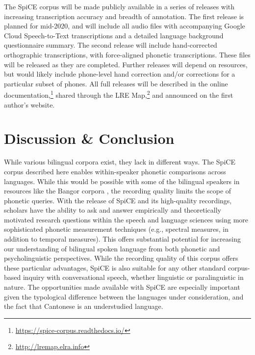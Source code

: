 The SpiCE corpus will be made publicly available in a series of releases with increasing transcription accuracy and breadth of annotation. The first release is planned for mid-2020, and will include all audio files with accompanying Google Cloud Speech-to-Text transcriptions and a detailed language background questionnaire summary. The second release will include hand-corrected orthographic transcriptions, with force-aligned phonetic transcriptions. These files will be released as they are completed. Further releases will depend on resources, but would likely include phone-level hand correction and/or corrections for a particular subset of phones. All full releases will be described in the online documentation,\footnote{\url{https://spice-corpus.readthedocs.io/}} shared through the LRE Map,\footnote{\url{http://lremap.elra.info}} and announced on the first author's website.

\section{Discussion \& Conclusion}\label{ch2:subsec:discussion}

While various bilingual corpora exist, they lack in different ways. The SpiCE corpus described here enables within-speaker phonetic comparisons across languages. While this would be possible with some of the bilingual speakers in resources like the Bangor corpora \citep{deuchar_2014_corpora}, the recording quality limits the scope of phonetic queries. With the release of SpiCE and its high-quality recordings, scholars have the ability to ask and answer empirically and theoretically motivated research questions within the speech and language sciences using more sophisticated phonetic measurement techniques (e.g., spectral measures, in addition to temporal measures). This offers substantial potential for increasing our understanding of bilingual spoken language from both phonetic and psycholinguistic perspectives. While the recording quality of this corpus offers these particular advantages, SpiCE is also suitable for any other standard corpus-based inquiry with conversational speech, whether linguistic or paralinguistic in nature. The opportunities made available with SpiCE are especially important given the typological difference between the languages under consideration, and the fact that Cantonese is an understudied language. 

\endinput %
